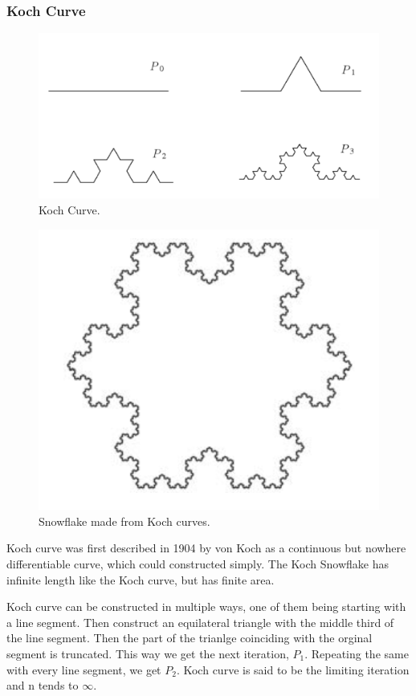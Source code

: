 \subsubsection{Koch Curve}
\begin{figure}[h!]
  \includegraphics[width=\linewidth]{Pictures/koch_curve.png}
  \caption{Koch Curve.}
  \label{fig:cantor_set}
\end{figure}
\begin{figure}[h!]
  \includegraphics[width=\linewidth]{Pictures/snowflake.png}
  \caption{Snowflake made from Koch curves.}
  \label{fig:snowflake}
\end{figure}
Koch curve was first described in 1904 by von Koch as a continuous but nowhere
differentiable curve, which could constructed simply.
The Koch Snowflake has infinite length like the Koch curve, but has finite area.

Koch curve can be constructed in multiple ways, one of them being starting with
a line segment. Then construct an equilateral triangle with the middle third of
the line segment. Then the part of the trianlge coinciding with the orginal
segment is truncated. This way we get the next iteration, $P_1$. Repeating the
same with every line segment, we get $P_2$. Koch curve is said to be the
limiting iteration and n tends to $\infty$.

